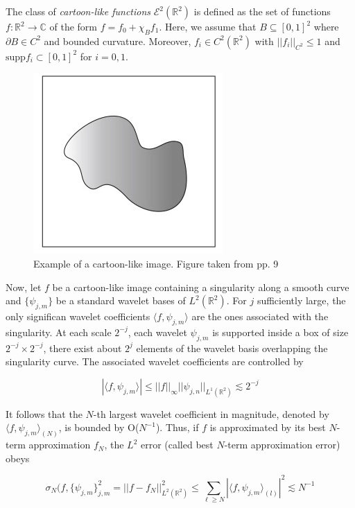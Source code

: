 \bigskip

\begin{defn}
The class of \textit{cartoon-like functions} $\mathcal{E}^2(\mathbb{R}^2)$ is defined as the set of functions $f:\mathbb{R}^2\longrightarrow \mathbb{C}$ of the form $f= f_0+\chi_B f_1$. Here, we assume that $B\subseteq [0,1]^2$ where $\partial B\in C^2$ and bounded curvature. Moreover, $f_i\in C^2(\mathbb{R}^2)$ with $||f_i||_{C^2}\leq 1$ and $\text{supp} f_i\subset [0,1]^2$ for $i=0,1$. 
\end{defn}

\bigskip

\begin{figure}[h!]
\centering
\includegraphics[width = 0.4 \textwidth]{./Diagrams/cartoon-like.jpg}
\caption{Example of a cartoon-like image. Figure taken from \cite{IntroShearlets} pp. 9}
\label{fig:cartoon-like}
\end{figure}

Now, let $f$ be a cartoon-like image containing a singularity along a smooth curve and $\{\psi_{j,m}\}$ be a standard wavelet bases of $L^2(\mathbb{R}^2)$. For $j$ sufficiently large, the only significan wavelet coefficients $\langle f,\psi_{ j,m}\rangle$ are the ones associated with the singularity. At each scale $2^{-j}$, each wavelet $\psi_{j,m}$ is supported inside a box of size $2^{-j}\times 2^{-j}$, there exist about $2^j$ elements of the wavelet basis overlapping the singularity curve. The associated wavelet coefficients are controlled by 

$$
|\langle f,	\psi_{j,m}\rangle|\leq ||f||_{\infty}||\psi_{j,n}||_{L^1(\mathbb{R}^2)}\lesssim 2^{-j}
$$

It follows that the $N$-th largest wavelet coefficient in magnitude, denoted by $\langle f,\psi_{j,m}\rangle_{(N)}$, is bounded by O($N^{-1}$). Thus, if $f$ is approximated by its best $N$-term approximation $f_N$, the $L^2$ error (called  best $N$-term approximation error) obeys

$$
\sigma_N(f,\{\psi_{j,m}\}_{j,m}^2=||f-f_N||^2_{L^2(\mathbb{R}^2)}\leq \sum_{\ell\geq N}|\langle f,\psi_{j,m}\rangle_{(l)}|^2\lesssim N^{-1}
$$

